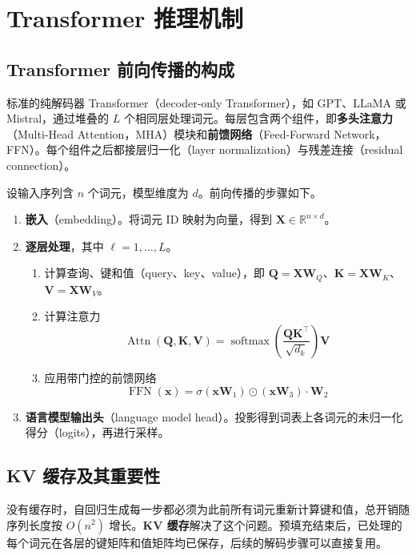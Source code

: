 \chapter{Transformer 推理机制}
\label{ch:transformer-inference}

\section{Transformer 前向传播的构成}

标准的纯解码器 Transformer（decoder-only Transformer），如 GPT、LLaMA 或 Mistral，通过堆叠的 $L$ 个相同层处理词元。每层包含两个组件，即\textbf{多头注意力}（Multi-Head Attention，MHA）模块和\textbf{前馈网络}（Feed-Forward Network，FFN）。每个组件之后都接层归一化（layer normalization）与残差连接（residual connection）。

设输入序列含 $n$ 个词元，模型维度为 $d$。前向传播的步骤如下。

\begin{enumerate}
  \item \textbf{嵌入}（embedding）。将词元 ID 映射为向量，得到 $\mathbf{X}\in\mathbb{R}^{n\times d}$。
  \item \textbf{逐层处理}，其中 $\ell=1,\ldots,L$。
  \begin{enumerate}
    \item 计算查询、键和值（query、key、value），即 $\mathbf{Q}=\mathbf{X}\mathbf{W}_Q$、$\mathbf{K}=\mathbf{X}\mathbf{W}_K$、$\mathbf{V}=\mathbf{X}\mathbf{W}_V$。
    \item 计算注意力
    \[
    \operatorname{Attn}(\mathbf{Q},\mathbf{K},\mathbf{V})
    =\operatorname{softmax}\!\left(\frac{\mathbf{Q}\mathbf{K}^{\top}}{\sqrt{d_k}}\right)\mathbf{V}
    \]
    \item 应用带门控的前馈网络
    \[
    \operatorname{FFN}(\mathbf{x})
    =\sigma(\mathbf{x}\mathbf{W}_1)\odot(\mathbf{x}\mathbf{W}_3)\cdot\mathbf{W}_2
    \]
  \end{enumerate}
  \item \textbf{语言模型输出头}（language model head）。投影得到词表上各词元的未归一化得分（logits），再进行采样。
\end{enumerate}

\section{KV 缓存及其重要性}

没有缓存时，自回归生成每一步都必须为此前所有词元重新计算键和值，总开销随序列长度按 $O(n^2)$ 增长。\textbf{KV 缓存}解决了这个问题。预填充结束后，已处理的每个词元在各层的键矩阵和值矩阵均已保存，后续的解码步骤可以直接复用。

